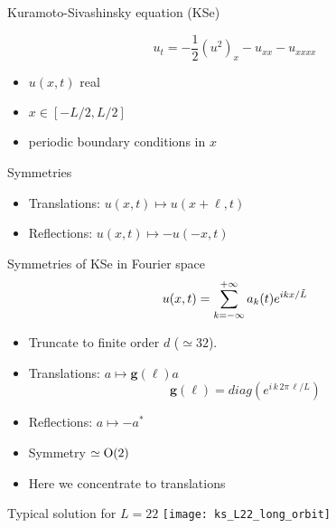 \begin{frame}{Kuramoto-Sivashinsky equation (KSe)}
 \begin{block}{}
  \[
	u_t =  -{\textstyle\frac{1}{2}}(u^2)_x-u_{xx}-u_{xxxx}
  \]
  \begin{itemize}
    \item $u(x,t)$ real
	\item $x\in[-L/2,L/2]$
	\item periodic boundary conditions in $x$
  \end{itemize}
 \end{block}
  \begin{block}{Symmetries}
    \begin{itemize}
	  \item Translations: $u(x,t) \mapsto u(x+\ell,t)$
	  \item Reflections: $u(x,t) \mapsto -u(-x,t)$
    \end{itemize}

  \end{block}
\end{frame}

\begin{frame}{Symmetries of KSe in Fourier space}
\[
    u(x,t)=\sum_{k=-\infty}^{+\infty} a_k (t) e^{ i k x /\tilde{L} }
\]
\begin{itemize}
  \item Truncate to finite order $d$ ($\simeq32$).
  \item Translations: $a\mapsto \mathbf{g}(\ell)a$
    \[
      \mathbf{g}(\ell)= diag(e^{i\,k\,2\pi\,\ell/L})
    \]
  \item Reflections: $a\mapsto -a^*$
  \item Symmetry $\simeq \textrm{O}(2)$
  \item Here we concentrate to translations
%   
\end{itemize}
\end{frame}

\begin{frame}{Typical solution for $L=22$}
  \centering
  \texttt{[image: ks\_L22\_long\_orbit]}

\end{frame}

